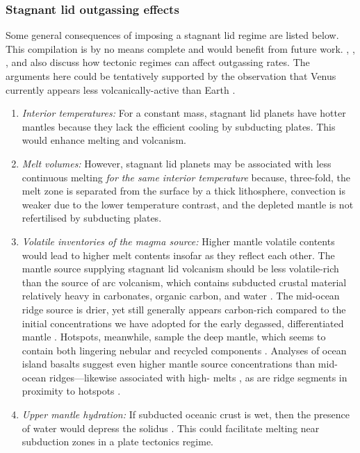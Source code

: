 \subsubsection{Stagnant lid outgassing effects}\label{sec:stagnant-lid}

Some general consequences of imposing a stagnant lid regime are listed below. This compilation is by no means complete and would benefit from future work. \citet{noack2014can}, \citet{tosi_habitability_2017}, \citet{foley_carbon_2018}, and \citet{Gaillard2021} also discuss how tectonic regimes can affect outgassing rates. The arguments here could be tentatively supported by the observation that Venus currently appears less volcanically-active than Earth \citep{Smrekar2010}. 

\begin{enumerate}

\item \textit{Interior temperatures:} For a constant mass, stagnant lid planets have hotter mantles because they lack the efficient cooling by subducting plates. This would enhance melting and volcanism.

\item \textit{Melt volumes:} However, stagnant lid planets may be associated with less continuous melting \textit{for the same interior temperature} because, three-fold, the melt zone is separated from the surface by a thick lithosphere, convection is weaker due to the lower temperature contrast, and the depleted mantle is not refertilised by subducting plates.

\item \textit{Volatile inventories of the magma source:} Higher mantle volatile contents would lead to higher melt contents insofar as they reflect each other. The mantle source supplying stagnant lid volcanism should be less volatile-rich than the source of arc volcanism, which contains subducted crustal material relatively heavy in carbonates, organic carbon, and water \citep{WALLACE2005}. The mid-ocean ridge source is drier, yet still generally appears carbon-rich compared to the initial concentrations we have adopted for the early degassed, differentiated mantle \citep{Hauri2019}. Hotspots, meanwhile, sample the deep mantle, which seems to contain both lingering nebular and recycled components \citep[e.g.,][]{MILLER2019}. Analyses of ocean island basalts suggest even higher mantle source concentrations than mid-ocean ridges---likewise associated with high- melts \citep[e.g.,][]{SHORTTLE2015, TUCKER2019, Broadley2019, MILLER2019}, as are ridge segments in proximity to hotspots \citep{Voyer2019}.  

\item \textit{Upper mantle hydration:} If subducted oceanic crust is wet, then the presence of water would depress the solidus \citep{katz_new_2003}. This could facilitate melting near subduction zones in a plate tectonics regime.
\end{enumerate}


